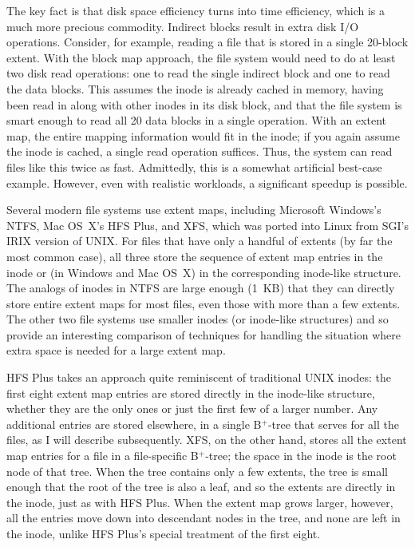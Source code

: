 The key fact is that disk space efficiency turns into time efficiency,
which is a much more precious commodity.  Indirect blocks result in
extra disk I/O operations.  Consider, for example, reading a file that
is stored in a single 20-block extent.  With the block map
approach, the file system would need to do at least two disk read
operations: one to read the single indirect block and one to read the
data blocks.  This assumes the inode is already cached in memory,
having been read in along with other inodes in its disk block, and
that the file system is smart enough to read all 20 data blocks in
a single operation.  With an extent map, the entire mapping
information would fit in the inode; if you again assume the inode is
cached, a single read operation suffices.  Thus, the system can read
files like this twice as fast.  Admittedly, this is a somewhat
artificial best-case example.  However, even with realistic workloads,
a significant speedup is possible.

Several modern file systems use extent maps, including Microsoft
Windows's NTFS, Mac OS~X's HFS Plus, and XFS, which was ported into
Linux from SGI's IRIX version of UNIX.  For files that have only a
handful of extents (by far the most common case), all three store the
sequence of extent map entries in the inode or (in Windows and Mac
OS~X) in the corresponding inode-like structure.  The analogs of inodes in
NTFS are large enough (1~KB) that they can directly store entire
extent maps for most files, even those with more than a few extents. The other
two file systems use smaller inodes (or inode-like structures) and so
provide an interesting comparison of techniques for handling the
situation where extra space is needed for a large extent map.

HFS Plus takes an approach quite reminiscent of traditional UNIX
inodes: the first eight extent map entries are stored directly in the
inode-like structure, whether they are the only ones or just the first
few of a larger number.  Any additional entries are stored elsewhere,
in a single B${}^+$-tree that serves for all the files, as I will describe
subsequently.  XFS, on the other hand, stores all the extent map entries for
a file in a file-specific B${}^+$-tree; the space in the inode is the root
node of that tree.  When the tree contains only a few extents, the
tree is small enough that the
root of the tree is also a leaf, and so the extents are directly in
the inode, just as with HFS Plus.  When the extent map grows larger,
however, all the entries move down into descendant nodes in the tree,
and none are left in the inode, unlike HFS Plus's special treatment of
the first eight.

